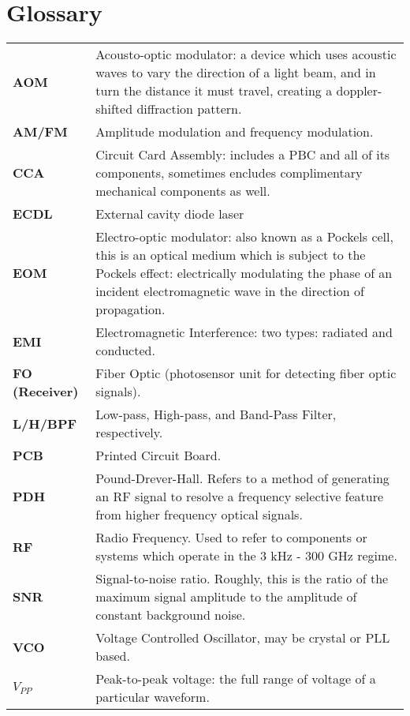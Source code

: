 \newpage
\section*{Glossary}

\begin{tabularx}{\linewidth}{lX}
  {\bf AOM} & Acousto-optic modulator: a device which uses acoustic waves to vary the direction of a light beam, and in turn the distance it must travel, creating a doppler-shifted diffraction pattern. \\
  {\bf AM/FM} & Amplitude modulation and frequency modulation. \\
  {\bf CCA} & Circuit Card Assembly: includes a PBC and all of its components,
  sometimes encludes complimentary mechanical components as well. \\
  {\bf ECDL} & External cavity diode laser \\
  {\bf EOM} & Electro-optic modulator: also known as a Pockels cell, this
  is an optical medium which is subject to the Pockels effect: electrically
  modulating the phase of an incident electromagnetic wave in the direction
  of propagation.\\
  {\bf EMI} & Electromagnetic Interference: two types: radiated and conducted.\\
  {\bf FO (Receiver)} & Fiber Optic (photosensor unit for detecting fiber optic
  signals).  \\
  {\bf L/H/BPF} & Low-pass, High-pass, and Band-Pass Filter, respectively. \\
  {\bf PCB} & Printed Circuit Board. \\
  {\bf PDH} & Pound-Drever-Hall. Refers to a method of generating an RF signal to resolve a frequency selective feature from higher frequency optical signals. \\
  {\bf RF} & Radio Frequency. Used to refer to components or systems which
  operate in the 3 kHz - 300 GHz regime. \\
  {\bf SNR} & Signal-to-noise ratio. Roughly, this is the ratio of the maximum signal amplitude to the amplitude of constant background noise. \\
  {\bf VCO} & Voltage Controlled Oscillator, may be crystal or PLL based. \\
  {\bf $V_{PP}$} & Peak-to-peak voltage: the full range of voltage of a
  particular waveform.
\end{tabularx}

